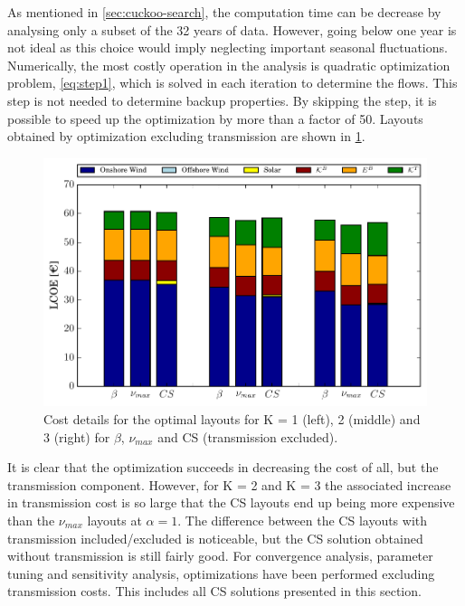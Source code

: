 \documentclass[a4paper, 12pt, sort&compress]{elsarticle}%
\begin{document}
As mentioned in \cref{sec:cuckoo-search}, the computation time can be
decrease by analysing only a subset of the 32 years of data. However,
going below one year is not ideal as this choice would imply
neglecting important seasonal fluctuations. Numerically, the most
costly operation in the analysis is quadratic optimization problem,
\cref{eq:step1}, which is solved in each iteration to determine the
flows. This step is not needed to determine backup properties. By
skipping the step, it is possible to speed up the optimization by more
than a factor of 50. Layouts obtained by optimization excluding
transmission are shown in \cref{fig:cost-no-transmission}.

\begin{figure}[h!]
  \centering
  \includegraphics[width = \columnwidth]{costTransVE50}
  \caption{Cost details for the optimal layouts for K = 1 (left), 2
    (middle) and 3 (right) for $\beta$, $\nu_{max}$ and CS (transmission excluded).}
  \label{fig:cost-no-transmission}
\end{figure}

It is clear that the optimization succeeds in decreasing the cost of
all, but the transmission component. However, for K = 2 and K = 3 the
associated increase in transmission cost is so large that the CS
layouts end up being more expensive than the $\nu_{max}$ layouts at
$\alpha = 1$. The difference between the CS layouts with transmission
included/excluded is noticeable, but the CS solution obtained without
transmission is still fairly good. For convergence analysis, parameter
tuning and sensitivity analysis, optimizations have been performed
excluding transmission costs. This includes all CS solutions presented
in this section.
\end{document}
